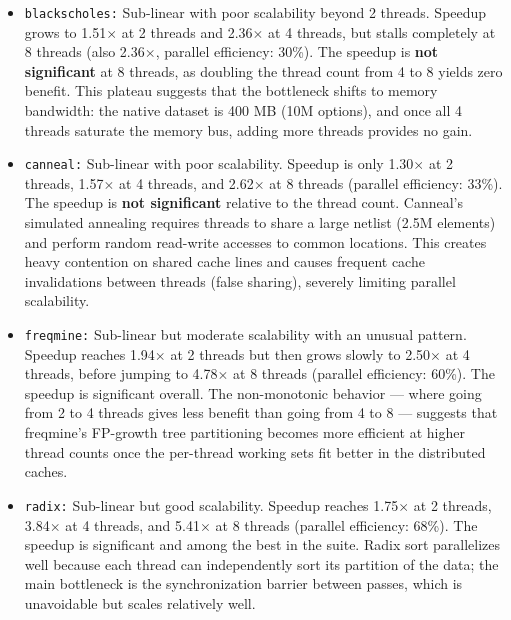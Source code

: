 \begin{enumerate}
\begin{enumerate}
\begin{itemize}
            \item \texttt{blackscholes:} Sub-linear with poor scalability beyond 2 threads. Speedup grows to 1.51$\times$ at 2 threads and 2.36$\times$ at 4 threads, but stalls completely at 8 threads (also 2.36$\times$, parallel efficiency: 30\%). The speedup is \textbf{not significant} at 8 threads, as doubling the thread count from 4 to 8 yields zero benefit. This plateau suggests that the bottleneck shifts to memory bandwidth: the native dataset is 400 MB (10M options), and once all 4 threads saturate the memory bus, adding more threads provides no gain.
            \\

            \item \texttt{canneal:} Sub-linear with poor scalability. Speedup is only 1.30$\times$ at 2 threads, 1.57$\times$ at 4 threads, and 2.62$\times$ at 8 threads (parallel efficiency: 33\%). The speedup is \textbf{not significant} relative to the thread count. Canneal's simulated annealing requires threads to share a large netlist (2.5M elements) and perform random read-write accesses to common locations. This creates heavy contention on shared cache lines and causes frequent cache invalidations between threads (false sharing), severely limiting parallel scalability.
            \\

            \item \texttt{freqmine:} Sub-linear but moderate scalability with an unusual pattern. Speedup reaches 1.94$\times$ at 2 threads but then grows slowly to 2.50$\times$ at 4 threads, before jumping to 4.78$\times$ at 8 threads (parallel efficiency: 60\%). The speedup is significant overall. The non-monotonic behavior — where going from 2 to 4 threads gives less benefit than going from 4 to 8 — suggests that freqmine's FP-growth tree partitioning becomes more efficient at higher thread counts once the per-thread working sets fit better in the distributed caches.
            \\

            \item \texttt{radix:} Sub-linear but good scalability. Speedup reaches 1.75$\times$ at 2 threads, 3.84$\times$ at 4 threads, and 5.41$\times$ at 8 threads (parallel efficiency: 68\%). The speedup is significant and among the best in the suite. Radix sort parallelizes well because each thread can independently sort its partition of the data; the main bottleneck is the synchronization barrier between passes, which is unavoidable but scales relatively well.
            \\


\end{itemize}
\end{enumerate}
\end{enumerate}
